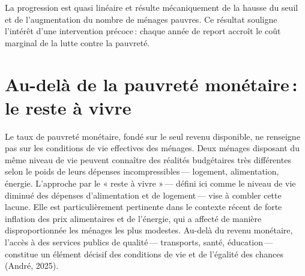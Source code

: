 \documentclass[
  french,
  9pt,
  a4paper,
]{article}
\begin{document}
La progression est quasi linéaire et résulte mécaniquement de la hausse
du seuil et de l'augmentation du nombre de ménages pauvres. Ce résultat
souligne l'intérêt d'une intervention précoce\,: chaque année de report
accroît le coût marginal de la lutte contre la pauvreté.

\section{Au-delà de la pauvreté monétaire\,: le reste à
vivre}\label{au-deluxe0-de-la-pauvretuxe9-monuxe9taire-le-reste-uxe0-vivre}

Le taux de pauvreté monétaire, fondé sur le seul revenu disponible, ne
renseigne pas sur les conditions de vie effectives des ménages. Deux
ménages disposant du même niveau de vie peuvent connaître des réalités
budgétaires très différentes selon le poids de leurs dépenses
incompressibles\,--- logement, alimentation, énergie. L'approche par le
« reste à vivre »\,--- défini ici comme le niveau de vie diminué des
dépenses d'alimentation et de logement\,--- vise à combler cette lacune.
Elle est particulièrement pertinente dans le contexte récent de forte
inflation des prix alimentaires et de l'énergie, qui a affecté de
manière disproportionnée les ménages les plus modestes. Au-delà du
revenu monétaire, l'accès à des services publics de qualité\,---
transports, santé, éducation\,--- constitue un élément décisif des
conditions de vie et de l'égalité des chances (André, 2025).
\end{document}
